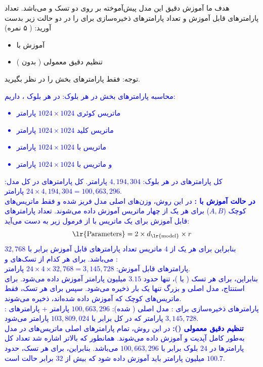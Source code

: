 \documentclass[12pt]{article}
\begin{document}
\begin{enumerate}
\begin{enumerate}
        هدف ما آموزش دقیق این مدل پیش‌آموخته بر روی دو تسک  و  می‌باشد.
        تعداد پارامترهای قابل آموزش و تعداد پارامترهای ذخیره‌سازی برای  را در دو حالت زیر بدست آورید: ( ۵ نمره) 
        \begin{itemize}
            \item آموزش با  
            \item تنظیم دقیق معمولی ( بدون ) 
        \end{itemize}
        توجه: فقط پارامترهای بخش  را در نظر بگیرید.

        \textcolor{blue}{
        محاسبه پارامترهای بخش  در هر بلوک:
        در هر بلوک ، داریم:
        \begin{itemize}
            \item ماتریس کوئری $1024 \times 1024$ پارامتر
            \item ماتریس کلید $1024 \times 1024$ پارامتر
            \item ماتریس  با $1024 \times 1024$ پارامتر
            \item و ماتریس  با $1024 \times 1024$ پارامتر
        \end{itemize}
        کل پارامترهای  در هر بلوک: $4,194,304$ پارامتر.
        کل پارامترهای  در کل مدل: $24 \times 4,194,304 = 100,663,296$ پارامتر.\\
        \textbf{در حالت آموزش با :}
        در این روش، وزن‌های اصلی مدل  فریز شده و فقط ماتریس‌های کوچک  ($A,B$) برای هر یک از چهار ماتریس  آموزش داده می‌شوند.
        تعداد پارامترهای قابل آموزش برای یک ماتریس با  از فرمول زیر به دست می‌آید:
        $$
        \text{\lr{Parameters}} = 2 \times d_{\text{\lr{model}}} \times r
        $$
        بنابراین برای هر یک از 4 ماتریس تعداد پارامترهای قابل آموزش برابر با $32,768$ می‌باشد. برای هر کدام از تسک‌های  و :\\
        پارامترهای قابل آموزش: $24 \times 4 \times 32,768 = 3,145,728$ پارامتر.\\
        بنابراین، برای هر تسک ( یا )، تنها حدود $3.15$ میلیون پارامتر آموزش داده می‌شود. برای استنتاج، مدل اصلی و بزرگ  تنها یک بار ذخیره می‌شود. سپس برای هر تسک، فقط ماتریس‌های کوچک  که آموزش داده شده‌اند، ذخیره می‌شوند.\\
        پارامترهای ذخیره‌سازی برای : مدل اصلی ( شده): $100,663,296$ پارامتر + پارامترهای : $3,145,728$ پارامتر که در کل برابر با $103,809,024$ پارامتر می‌شود.\\
        \textbf{تنظیم دقیق معمولی ():}
        در این روش، تمام پارامترهای اصلی ماتریس‌های  در مدل  به‌طور کامل آپدیت و آموزش داده می‌شوند. همانطور که بالاتر اشاره شد تعداد کل پارامترها در $24$ بلوک برابر با $100,663,296$ می‌باشد. بنابراین، برای هر تسک، حدود $100.7$ میلیون پارامتر باید آموزش داده شود که بیش از $32$ برابر حالت  است.
        }
        

\end{enumerate}
\end{enumerate}
\end{document}
